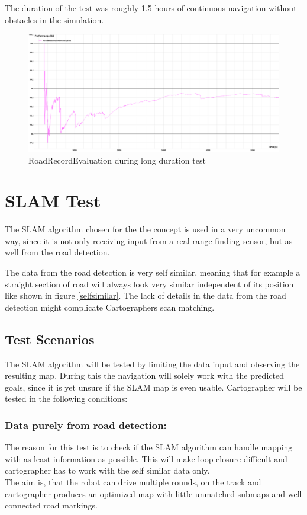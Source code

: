 The duration of the test was roughly 1.5 hours of continuous navigation without obstacles in the simulation.

\begin{figure} 
	\includegraphics[width=\textwidth]{Pictures/long duration road detection test}
	\caption{RoadRecordEvaluation during long duration test}
	\label{longdurroad}
\end{figure}

\section{SLAM Test}
The SLAM algorithm chosen for the the concept is used in a very uncommon way, since it is not only receiving input from a real range finding sensor, but as well from the road detection.

The data from the road detection is very self similar, meaning that for example a straight section of road will always look very similar independent of its position like shown in figure \ref{selfsimilar}. The lack of details in the data from the road detection might complicate Cartographers scan matching.\\

\subsection{Test Scenarios}
The SLAM algorithm will be tested by limiting the data input and observing the resulting map. During this the navigation will solely work with the predicted goals, since it is yet unsure if the SLAM map is even usable. Cartographer will be tested in the following conditions:

\subsubsection{Data purely from road detection:}
The reason for this test is to check if the SLAM algorithm can handle mapping with as least information as possible. This will make loop-closure difficult and cartographer has to work with the self similar data only.\\
The aim is, that the robot can drive multiple rounds, on the track and cartographer produces an optimized map with little unmatched submaps and well connected road markings.\\

